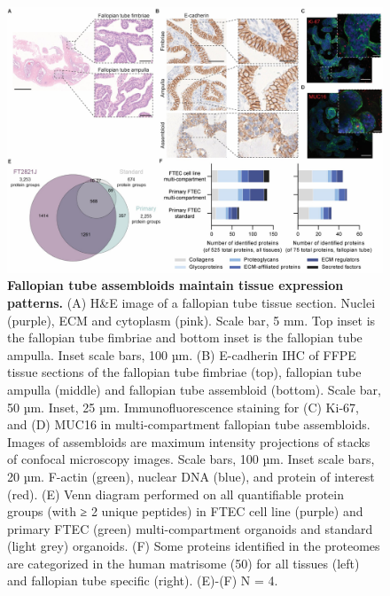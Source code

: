 \begin{refsection}
    \begin{figure}[p]
        \begin{center}
            \includegraphics[width=1\textwidth,height=0.85\textheight,keepaspectratio,clip,page=1]{figures/chapter4/fig_2.jpg}
            \captionsetup{font=small}
            \caption{\textbf{Fallopian tube assembloids maintain tissue expression patterns.} (A) H\&E image of a fallopian tube tissue section. Nuclei (purple), ECM and cytoplasm (pink). Scale bar, 5 mm. Top inset is the fallopian tube fimbriae and bottom inset is the fallopian tube ampulla. Inset scale bars, 100 µm. (B) E-cadherin IHC of FFPE tissue sections of the fallopian tube fimbriae (top), fallopian tube ampulla (middle) and fallopian tube assembloid (bottom). Scale bar, 50 µm. Inset, 25 µm. Immunofluorescence staining for (C) Ki-67, and (D) MUC16 in multi-compartment fallopian tube assembloids. Images of assembloids are maximum intensity projections of stacks of confocal microscopy images. Scale bars, 100 µm. Inset scale bars, 20 µm. F-actin (green), nuclear DNA (blue), and protein of interest (red). (E) Venn diagram performed on all quantifiable protein groups (with ≥ 2 unique peptides) in FTEC cell line (purple) and primary FTEC (green) multi-compartment organoids and standard (light grey) organoids. (F) Some proteins identified in the proteomes are categorized in the human matrisome (50) for all tissues (left) and fallopian tube specific (right). (E)-(F) N = 4.}
            \label{chapter4_fig2}
        \end{center}
    \end{figure}


\end{refsection}
